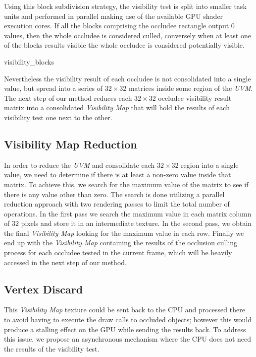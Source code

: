 \documentclass[10pt, conference]{IEEEtran}
\begin{document}
Using this block subdivision strategy, the visibility test is split into smaller task units and performed in parallel making use of the available GPU shader execution cores. 
If all the blocks comprising the occludee rectangle output $0$ values, then the whole occludee is considered culled, conversely when at 
least one of the blocks results visible the whole occludee is considered potentially visible.\


{visibility_blocks}{
%
}




Nevertheless the visibility result of each occludee is not consolidated into a single value, but spread into a series of $32 \times 32$ matrices inside some region of the \emph{UVM}. 
The next step of our method reduces each $32 \times 32$ occludee visibility result matrix into a consolidated \emph{Visibility Map} that will hold the results of each visibility test one next to the other.\

\subsection{Visibility Map Reduction}
%
In order to reduce the \emph{UVM} and consolidate each $32 \times 32$ region into a single value, we need to determine if there is at least a non-zero value inside that matrix. 
To achieve this, we search for the maximum value of the matrix to see if there is any value other than zero. 
The search is done utilizing a parallel reduction approach with two rendering passes to limit the total number of operations. 
In the first pass we search the maximum value in each matrix column of $32$ pixels and store it in an intermediate texture. 
In the second pass, we obtain the final \emph{Visibility Map} looking for the maximum value in each row. 
Finally we end up with the \emph{Visibility Map} containing the results of the occlusion culling process for each occludee tested in the current frame, which will be heavily accessed in the next step of our method. 


\subsection{Vertex Discard}
%
This \emph{Visibility Map} texture could be sent back to the CPU and processed there to avoid having to execute the draw calls to occluded objects; 
however this would produce a stalling effect on the GPU while sending the results back. 
To address this issue, we propose an asynchronous mechanism where the CPU does not need the results of the visibility test.\
\end{document}
